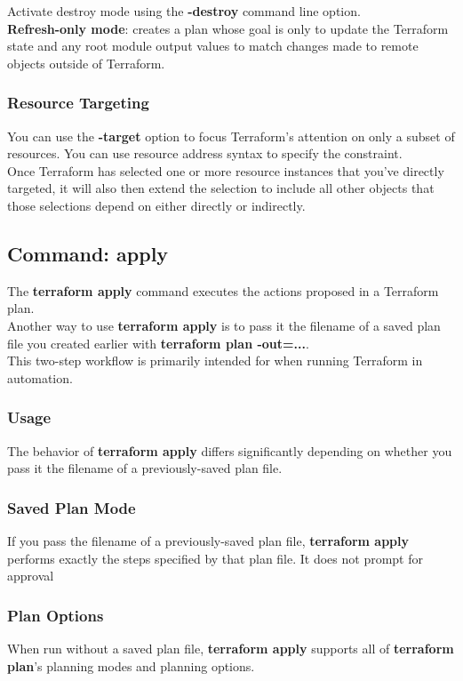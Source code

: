\documentclass[12pt, letterpaper, twoside]{article}
\begin{document}
Activate destroy mode using the \textbf{-destroy} command line option.\\

\textbf{Refresh-only mode}: creates a plan whose goal is only to update the Terraform state 
and any root module output values to match changes made to remote objects outside 
of Terraform.

\subsubsection{Resource Targeting}
You can use the \textbf{-target} option to focus Terraform's attention on only a 
subset of resources. You can use resource address syntax to specify the constraint.\\
Once Terraform has selected one or more resource instances that you've directly targeted, 
it will also then extend the selection to include all other objects that those selections 
depend on either directly or indirectly.

\subsection{Command: apply}
The \textbf{terraform apply} command executes the actions proposed in a Terraform plan.\\
Another way to use \textbf{terraform apply} is to pass it the filename of a saved plan file 
you created earlier with \textbf{terraform plan -out=...}.\\
This two-step workflow is primarily intended for when running Terraform in automation.

\subsubsection{Usage}
The behavior of \textbf{terraform apply} differs significantly depending on whether you 
pass it the filename of a previously-saved plan file.

\subsubsection{Saved Plan Mode}
If you pass the filename of a previously-saved plan file, \textbf{terraform apply} performs 
exactly the steps specified by that plan file. It does not prompt for approval

\subsubsection{Plan Options}
When run without a saved plan file, \textbf{terraform apply} supports all of 
\textbf{terraform plan}'s planning modes and planning options.
\end{document}
